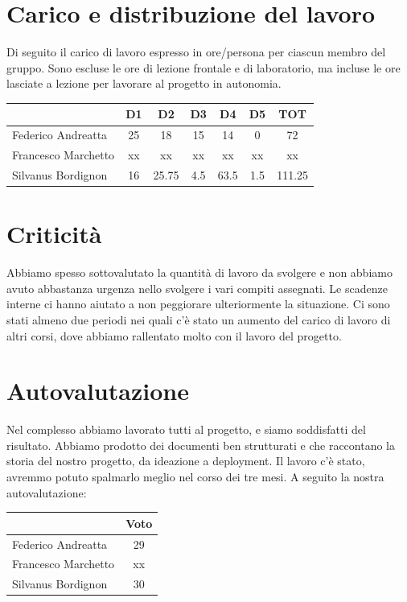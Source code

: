 \documentclass[a4paper,12pt]{article}
\begin{document}
\section{Carico e distribuzione del lavoro}

Di seguito il carico di lavoro espresso in ore/persona per ciascun membro del gruppo. Sono escluse le ore di lezione frontale e di laboratorio, ma incluse le ore lasciate a lezione per lavorare al progetto in autonomia.

\begin{tabular}{|l|c|c|c|c|c|c|}
    \hline
    & \textbf{D1} & \textbf{D2} & \textbf{D3} & \textbf{D4} & \textbf{D5} & \textbf{TOT} \\ \hline
    Federico Andreatta & 25 & 18 & 15 & 14 & 0 & 72 \\ \hline
    Francesco Marchetto & xx & xx & xx & xx & xx & xx \\ \hline
    Silvanus Bordignon & 16 & 25.75 & 4.5 & 63.5 & 1.5 & 111.25 \\ \hline
\end{tabular}

\section{Criticità}

Abbiamo spesso sottovalutato la quantità di lavoro da svolgere e non abbiamo avuto abbastanza urgenza nello svolgere i vari compiti assegnati. Le scadenze interne ci hanno aiutato a non peggiorare ulteriormente la situazione. Ci sono stati almeno due periodi nei quali c'è stato un aumento del carico di lavoro di altri corsi, dove abbiamo rallentato molto con il lavoro del progetto.

\section{Autovalutazione}

Nel complesso abbiamo lavorato tutti al progetto, e siamo soddisfatti del risultato. Abbiamo prodotto dei documenti ben strutturati e che raccontano la storia del nostro progetto, da ideazione a deployment. Il lavoro c'è stato, avremmo potuto spalmarlo meglio nel corso dei tre mesi. A seguito la nostra autovalutazione:

\begin{tabular}{|l|c|}
    \hline
    & Voto \\ \hline
    Federico Andreatta & 29 \\ \hline
    Francesco Marchetto & xx \\ \hline
    Silvanus Bordignon & 30 \\ \hline
\end{tabular}
\end{document}

